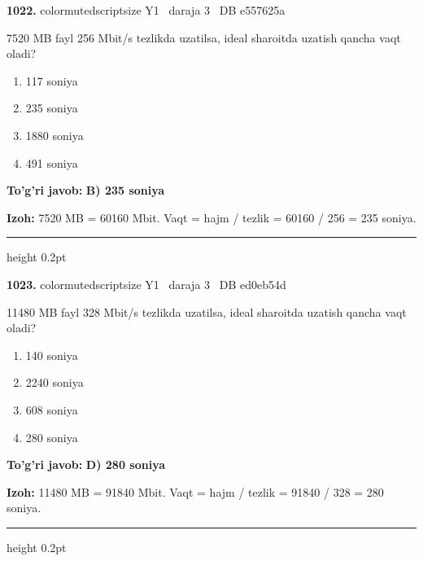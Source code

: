 \documentclass[10pt,a4paper,oneside]{article}
\begin{document}
\noindent\textbf{\color{ink}1022.}  {color{muted}scriptsize Y1 \textbullet\ daraja 3 \textbullet\ DB e557625a}
\par
7520 MB fayl 256 Mbit/s tezlikda uzatilsa, ideal sharoitda uzatish qancha vaqt oladi?
\begin{enumerate}[label=\Alph*),leftmargin=9mm]
\item 117 soniya
\item 235 soniya
\item 1880 soniya
\item 491 soniya
\end{enumerate}
\begin{tcolorbox}[enhanced,breakable,colback=teal!4,colframe=teal!50!black,boxrule=0.5pt,arc=1.1mm,left=3mm,right=3mm,top=1.7mm,bottom=1.7mm,before skip=2mm,after skip=2mm]
\textbf{\color{teal}To'g'ri javob:} \textbf{B) 235 soniya}
\par\smallskip
\textbf{Izoh:} 7520 MB = 60160 Mbit. Vaqt = hajm / tezlik = 60160 / 256 = 235 soniya.
\end{tcolorbox}
\vspace{2mm}\hrule height 0.2pt \vspace{3mm}

\noindent\textbf{\color{ink}1023.}  {color{muted}scriptsize Y1 \textbullet\ daraja 3 \textbullet\ DB ed0eb54d}
\par
11480 MB fayl 328 Mbit/s tezlikda uzatilsa, ideal sharoitda uzatish qancha vaqt oladi?
\begin{enumerate}[label=\Alph*),leftmargin=9mm]
\item 140 soniya
\item 2240 soniya
\item 608 soniya
\item 280 soniya
\end{enumerate}
\begin{tcolorbox}[enhanced,breakable,colback=teal!4,colframe=teal!50!black,boxrule=0.5pt,arc=1.1mm,left=3mm,right=3mm,top=1.7mm,bottom=1.7mm,before skip=2mm,after skip=2mm]
\textbf{\color{teal}To'g'ri javob:} \textbf{D) 280 soniya}
\par\smallskip
\textbf{Izoh:} 11480 MB = 91840 Mbit. Vaqt = hajm / tezlik = 91840 / 328 = 280 soniya.
\end{tcolorbox}
\vspace{2mm}\hrule height 0.2pt \vspace{3mm}
\end{document}
